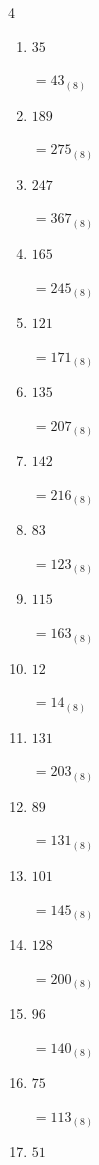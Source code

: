 \begin{multicols}{4}
\begin{enumerate}
  \item $35$

        $=43_{(8)}$

  \item $189$

        $=275_{(8)}$

  \item $247$

        $=367_{(8)}$

  \item $165$

        $=245_{(8)}$

  \item $121$

        $=171_{(8)}$

  \item $135$

        $=207_{(8)}$

  \item $142$

        $=216_{(8)}$

  \item $83$

        $=123_{(8)}$

  \item $115$

        $=163_{(8)}$

  \item $12$

        $=14_{(8)}$

\columnbreak %

  \item $131$

        $=203_{(8)}$

  \item $89$

        $=131_{(8)}$

  \item $101$

        $=145_{(8)}$

  \item $128$

        $=200_{(8)}$

  \item $96$

        $=140_{(8)}$

  \item $75$

        $=113_{(8)}$

  \item $51$


\end{enumerate}
\end{multicols}
